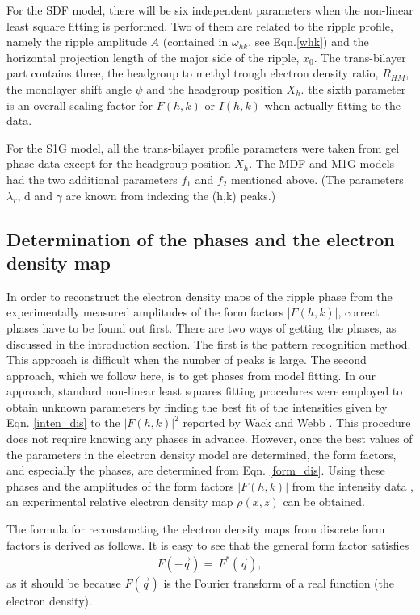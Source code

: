 For the SDF model, there will be six independent parameters when the 
non-linear least square fitting is performed. Two of them are related to the 
ripple profile, namely the ripple amplitude $A$ (contained in $\omega_{hk}$, 
see Eqn.\ref{whk}) and the horizontal projection length of the major side of 
the ripple, $x_0$. The trans-bilayer part contains three, the headgroup to 
methyl trough electron density ratio, $R_{HM}$, the monolayer shift angle 
$\psi$ and the headgroup position $X_h$. the sixth parameter is an overall 
scaling factor for $F(h,k)$ or $I(h,k)$ when actually fitting to the data. 

For the S1G model, all the trans-bilayer profile parameters
were taken from gel phase data \cite{WSN89} except for the headgroup position
$X_h$. The MDF and M1G models had the two additional parameters $f_1$ and 
$f_2$ mentioned above. (The parameters ${\lambda}_r$, d and $\gamma$ are known
from indexing the (h,k) peaks.)
 
\subsection{Determination of the phases and the electron density map}
\label{rppl_theory_6}

In order to reconstruct the electron density maps of the ripple phase
from the experimentally measured amplitudes of the form factors $|F(h,k)|$, 
correct phases have to be found out first. There are two ways of getting 
the phases, as discussed in the introduction section. The first is 
the pattern recognition method. This approach
is difficult when the number of peaks is large. The second approach,
which we follow here, is to get phases from model fitting. 
In our approach, standard non-linear least squares fitting procedures were 
employed to obtain unknown parameters by finding the best
fit of the intensities given by Eqn. \ref{inten_dis} to the $|F(h,k)|^2$ 
reported by Wack and Webb \cite{Wac89a}. 
This procedure does not require knowing any phases in advance.  However,
once the best values of the parameters in the electron density model are
determined, the form factors, and especially the phases, are determined
from Eqn. \ref{form_dis}.
Using these phases and the amplitudes of the form factors $|F(h,k)|$ from 
the intensity data \cite{Wac89a},
an experimental relative electron density map $\rho(x,z)$ can be obtained. 

The formula for reconstructing the electron density maps
from discrete form factors is derived as follows. It is easy to see that 
the general form factor satisfies 
\begin{eqnarray}
\label{formallcon2}
F(-\vec{q}) = \ F^{*}(\vec{q}),
\end{eqnarray}
as it should be because $F(\vec{q})$ is the Fourier transform of a real
function (the electron density).


